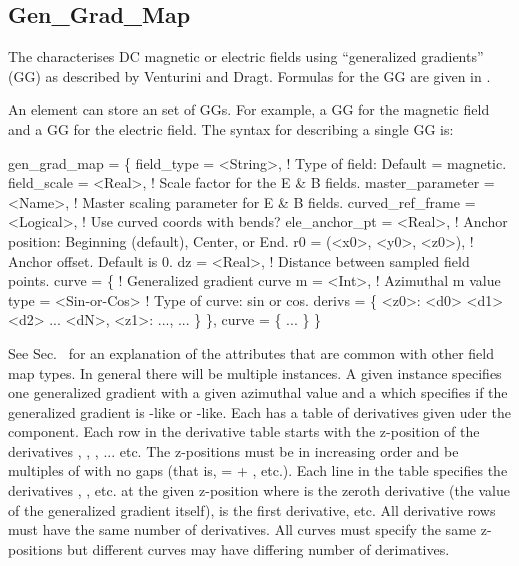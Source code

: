 \subsection{Gen_Grad_Map}
\label{s:gen.grad.map}

The  characterises DC magnetic or electric fields using ``generalized gradients''
(GG) as described by Venturini and Dragt\cite{b:gen.grad}. Formulas for the GG are given in
.

An element can store an set of GGs. For example, a GG for the magnetic field and a GG for the
electric field. The syntax for describing a single GG is:
\begin{example}
  gen_grad_map = \{
    field_type       = <String>,    ! Type of field: Default = magnetic.
    field_scale      = <Real>,      ! Scale factor for the E & B fields.
    master_parameter = <Name>,      ! Master scaling parameter for E & B fields.
    curved_ref_frame = <Logical>,   ! Use curved coords with bends?
    ele_anchor_pt    = <Real>,      ! Anchor position: Beginning (default), Center, or End.
    r0               = (<x0>, <y0>, <z0>), ! Anchor offset. Default is 0.
    dz               = <Real>,             ! Distance between sampled field points.
    curve = \{                      ! Generalized gradient curve
      m = <Int>,                    ! Azimuthal m value
      type = <Sin-or-Cos>           ! Type of curve: sin or cos.
      derivs = \{
        <z0>: <d0> <d1> <d2> ... <dN>,
        <z1>: ...,
        ...
      \}
    \},
    curve = \{
      ...
    \}
  \}
\end{example}
See Sec.~ for an explanation of the attributes that are common with other field
map types. In general there will be multiple  instances.  A given  instance
specifies one generalized gradient with a given azimuthal  value and a  which
specifies if the generalized gradient is -like or -like. Each  has a table
of derivatives given uder the  component. Each row in the derivative table starts with
the z-position of the derivatives , , , ... etc. The z-positions must be in
increasing order and be multiples of  with no gaps (that is,  =  + ,
etc.). Each line in the  table specifies the derivatives , , etc. at
the given z-position where  is the zeroth derivative (the value of the generalized gradient
itself),  is the first derivative, etc. All derivative rows must have the same number of
derivatives.  All curves must specify the same z-positions but different curves may have differing
number of derimatives.

